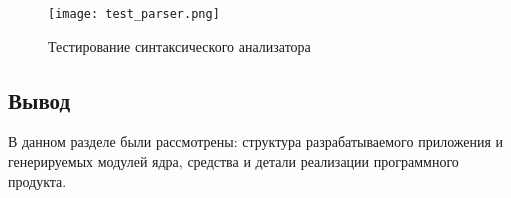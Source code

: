 \begin{table}[htb!]
\end{table}

\begin{figure}[!h]
    \centering
    \texttt{[image: test\_parser.png]}
    \caption{Тестирование синтаксического анализатора}
    \label{fig:test_parser}
\end{figure}

\subsection*{Вывод}

В данном разделе были рассмотрены: структура разрабатываемого приложения и
генерируемых модулей ядра, средства и детали реализации программного продукта.

